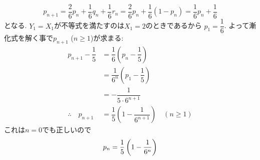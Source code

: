 \[p_{n+1} = \dfrac{2}{6}p_n + \dfrac{1}{6}q_n + \dfrac{1}{6}r_n = \dfrac{2}{6}p_n + \dfrac{1}{6
}(1-p_n) = \dfrac{1}{6}p_n+ \dfrac{1}{6}\]
となる. $Y_1 = X_1$が不等式を満たすのは$X_1 = 2$のときであるから $p_1 = \dfrac{1}{6}$. よって漸化式を解く事で$p_{n+1}$ ($n\geq 1$)が求まる: 
\begin{align*}
p_{n+1} - \dfrac{1}{5} &= \dfrac{1}{6} \left( p_n - \dfrac{1}{5}\right) \\
&= \dfrac{1}{6^n} \left(p_1 - \dfrac{1}{5} \right) \\
&= -\dfrac{1}{5\cdot 6^{n+1}} \\
\therefore \quad p_{n+1} &= \dfrac{1}{5} \left( 1 - \dfrac{1}{6^{n+1} } \right) \quad (n\geq 1)
\end{align*}
これは$n=0$でも正しいので
\[{\boldmath p_n = \dfrac{1}{5} \left( 1 - \dfrac{1}{6^n} \right) }\]

